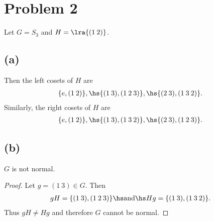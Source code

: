\documentclass{article}
\begin{document}
\section*{Problem 2}

Let $G=S_3$ and $H=\lra{(1\: 2)}$.

\subsection*{(a)}

Then the left cosets of $H$ are
\begin{align*}
    \{e, (1\:2)\},\hs \{(1\:3), (1\:2\:3)\},\hs \{(2\:3), (1\:3\:2)\}.
\end{align*}
Similarly, the right cosets of $H$ are
\begin{align*}
    \{e, (1\:2)\},\hs \{(1\:3), (1\:3\:2)\},\hs \{(2\:3),(1\:2\:3)\}.
\end{align*}

\subsection*{(b)}

\begin{claim*}
    $G$ is not normal.
\end{claim*}

\begin{proof}
    Let $g=(1\:3)\in G$. Then
    \begin{align*}
        gH=\{(1\:3), (1\:2\:3)\}\hs\text{and}\hs Hg=\{(1\:3), (1\:3\:2)\}.
    \end{align*}
    Thus $gH\not=Hg$ and therefore $G$ cannot be normal.
\end{proof}
\end{document}
